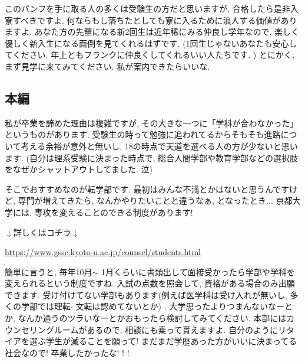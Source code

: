\documentclass[10pt,b5jsbook,dvips,dvipdfmx,openany]{jsbook}
\theoremstyle{definition}
\begin{document}
		このパンフを手に取る人の多くは受験生の方だと思いますが, 合格したら是非入寮すべきですよ. 何ならもし落ちたとしても寮に入るために浪人する価値がありますよ. あなた方の先輩になる新2回生は近年稀にみる仲良し学年なので, 楽しく優しく新入生になる面倒を見てくれるはずです. (1回生じゃないあなたも安心してください. 年上ともフランクに仲良くしてくれるいい人たちです. ) %
とにかく, まず見学に来てみてください. 私が案内できたらいいな. 

		\subsection{本編}
		私が卒業を諦めた理由は複雑ですが, その大きな一つに「学科が合わなかった」というものがあります. 受験生の時って勉強に追われてるからそもそも進路について考える余裕が意外と無いし, 18の時点で天道を選べる人の方が少ないと思います. (自分は理系受験に決まった時点で, 総合人間学部や教育学部などの選択肢をなぜかシャットアウトしてました. 泣) 

		そこでおすすめなのが転学部です. 最初はみんな不満とかはないと思うんですけど, 専門が増えてきたら, なんかやりたいことと違うなぁ, となったとき... 京都大学には, 専攻を変えることのできる制度があります!  
		
		$\downarrow$詳しくはコチラ$\downarrow$

		\url{https://www.gssc.kyoto-u.ac.jp/counsel/students.html}

		簡単に言うと, 毎年10月$ \sim $ 1月くらいに書類出して面接受かったら学部や学科を変えられるという制度ですね. 入試の点数を照会して, 資格がある場合のみ出願できます. 受け付けてない学部もあります(例えば医学科は受け入れが無いし, 多くの学部では理転$ \cdot $ 文転は認めてないとか) . 大学思ったよりつまんないなーとか, なんか通うのツラいなーとかおもったら検討してみてください. 本部にはカウンセリングルームがあるので, 相談にも乗って貰えますよ. 自分のようにリタイアを選ぶ学生が減ることを願って! まだまだ学歴あった方がいいに決まってる社会なので! 卒業したかったな! ! ! 
\end{document}

